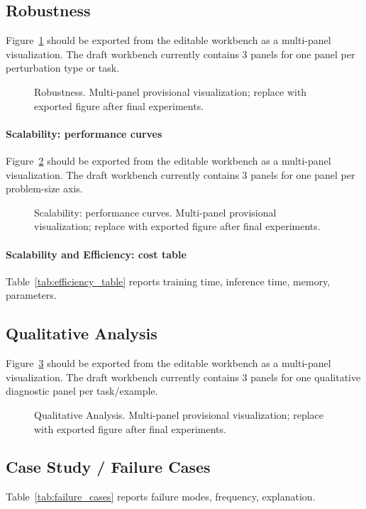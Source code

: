 \subsection{Robustness}
Figure~\ref{fig:robustness} should be exported from the editable workbench as a multi-panel visualization. The draft workbench currently contains 3 panels for one panel per perturbation type or task.
\begin{figure}[t]
\centering
{}
\caption{Robustness. Multi-panel provisional visualization; replace with exported figure after final experiments.}
\label{fig:robustness}
\end{figure}

\paragraph{Scalability: performance curves}
Figure~\ref{fig:scalability_curve} should be exported from the editable workbench as a multi-panel visualization. The draft workbench currently contains 3 panels for one panel per problem-size axis.
\begin{figure}[t]
\centering
{}
\caption{Scalability: performance curves. Multi-panel provisional visualization; replace with exported figure after final experiments.}
\label{fig:scalability_curve}
\end{figure}

\paragraph{Scalability and Efficiency: cost table}
Table~\ref{tab:efficiency_table} reports training time, inference time, memory, parameters.


\subsection{Qualitative Analysis}
Figure~\ref{fig:qualitative} should be exported from the editable workbench as a multi-panel visualization. The draft workbench currently contains 3 panels for one qualitative diagnostic panel per task/example.
\begin{figure}[t]
\centering
{}
\caption{Qualitative Analysis. Multi-panel provisional visualization; replace with exported figure after final experiments.}
\label{fig:qualitative}
\end{figure}

\subsection{Case Study / Failure Cases}
Table~\ref{tab:failure_cases} reports failure modes, frequency, explanation.

